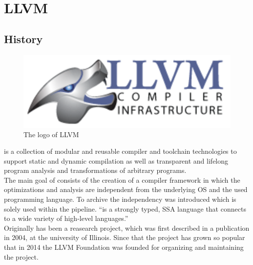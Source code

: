 \chapter{LLVM}
\section{History}
\begin{figure}
    \caption[The logo of LLVM]{The logo of LLVM \cite{llvmLogo}}
    \includegraphics[width=.5\textwidth]{gfx/llvmLogo.png}
\end{figure}
\llvm is a collection of modular and reusable compiler and toolchain technologies to support static and dynamic compilation as well as transparent and lifelong program analysis and transformations of arbitrary programs. \cite{LLVMWebsite, LLVMResearchBeginning}\\
The main goal of \llvm consists of the creation of a compiler framework in which the optimizations and analysis are independent from the underlying OS and the used programming language.
To archive the independency \llvmir was introduced which is solely used within the pipeline.
\enquote{\llvmir is a strongly typed, \ac{SSA} language that connects to a wide variety of high-level languages.} \cite{PolyhedralEmpiricalStudy}\\
Originally \llvm has been a reasearch project, which was first described in a publication in 2004, at the university of Illinois.
Since that the project has grown so popular that in 2014 the LLVM Foundation was founded for organizing and maintaining the project. \cite{LLVMFoundation}\\

